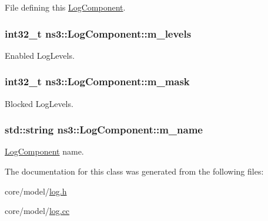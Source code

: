 File defining this \hyperlink{classns3_1_1LogComponent}{Log\+Component}. 

\subsubsection[{\texorpdfstring{m\+\_\+levels}{m_levels}}]{\setlength{\rightskip}{0pt plus 5cm}int32\+\_\+t ns3\+::\+Log\+Component\+::m\+\_\+levels\hspace{0.3cm}{\ttfamily [private]}}\hypertarget{classns3_1_1LogComponent_a5d615e327e15f2a57457844ca70313b1}{}\label{classns3_1_1LogComponent_a5d615e327e15f2a57457844ca70313b1}


Enabled Log\+Levels. 

\subsubsection[{\texorpdfstring{m\+\_\+mask}{m_mask}}]{\setlength{\rightskip}{0pt plus 5cm}int32\+\_\+t ns3\+::\+Log\+Component\+::m\+\_\+mask\hspace{0.3cm}{\ttfamily [private]}}\hypertarget{classns3_1_1LogComponent_acc996a608820204f9c01c01cc3157484}{}\label{classns3_1_1LogComponent_acc996a608820204f9c01c01cc3157484}


Blocked Log\+Levels. 

\subsubsection[{\texorpdfstring{m\+\_\+name}{m_name}}]{\setlength{\rightskip}{0pt plus 5cm}std\+::string ns3\+::\+Log\+Component\+::m\+\_\+name\hspace{0.3cm}{\ttfamily [private]}}\hypertarget{classns3_1_1LogComponent_af7fcce0f3820136c19e478622baf0db6}{}\label{classns3_1_1LogComponent_af7fcce0f3820136c19e478622baf0db6}


\hyperlink{classns3_1_1LogComponent}{Log\+Component} name. 



The documentation for this class was generated from the following files\+:\begin{DoxyCompactItemize}
\item 
core/model/\hyperlink{log_8h}{log.\+h}\item 
core/model/\hyperlink{log_8cc}{log.\+cc}\end{DoxyCompactItemize}
